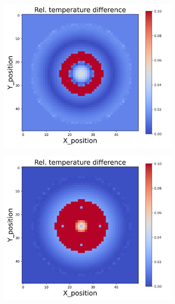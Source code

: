 {\begin{figure}[h]
\begin{minipage}{\textwidth}
\begin{subfigure}{0.27\textwidth}
        \end{subfigure}
        \begin{subfigure}{0.27\textwidth}
            \centering
            \includegraphics[width=\textwidth]{figures/raw_data/23/quad/T_bias.jpg}
        \end{subfigure}
        \begin{subfigure}{0.27\textwidth}
            \centering
            \includegraphics[width=\textwidth]{figures/raw_data/24/quad/T_bias.jpg}

\end{subfigure}
\end{minipage}
\end{figure}}
